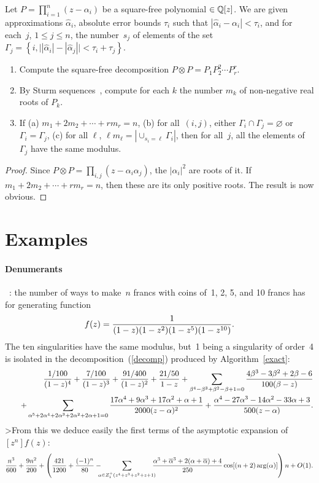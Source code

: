 \begin{alg}\label{test}
Let $P=\prod_{i=1}^n (z-\alpha_i)$ be a
square-free polynomial $\in {\Bbb Q}[z]$.
We are given
approximations $\hat\alpha_i$,
absolute error bounds $\tau_i$ such that  
$|\hat\alpha_i-\alpha_i|<\tau_i$,
and for each~$j$, $1 \leq j \leq n$, the number~$s_j$ of elements of the set
$ \Gamma_j=\left\{ i,
\bigl||\hat\alpha_i|-|\hat\alpha_j|\bigr|<\tau_i+\tau_j\right\}$.
\begin{enumerate}
\item Compute the square-free decomposition
$P\otimes P=P_1P_2^2\cdots P_r^r$.
\item By Sturm sequences~\cite{Sturm35}, compute for each $k$ the
number $m_k$ of non-negative real roots of $P_k$.
\item If (a) $m_1+2m_2+\cdots+rm_r=n$, (b) for all~$(i,j)$, either
$\Gamma_i \cap \Gamma_j=\varnothing$ 
or $\Gamma_i = \Gamma_j$, (c) for all $\ell$, $\ell m_\ell=
\left|\cup_{s_i=\ell} \Gamma_i \right|$,
then for all~$j$, all the elements of\/ $\Gamma_j$ have the same modulus.
\end{enumerate}
\end{alg}
\begin{proof} Since $P\otimes P=\prod_{i,j} (z-\alpha_i
\alpha_j)$, the $|\alpha_i|^2$ are roots of it. If
$m_1+2m_2+\cdots+rm_r=n$, then these are its only positive roots. The
result is now obvious.
\end{proof}

\section{Examples}

\paragraph{Denumerants}~\cite[p.~108]{Comtet74}: the  number of ways to make~$n$
francs  with coins of~1, 2,   5,   and 10 francs  has  for  generating
function      \[f(z)={1\over(1-z)(1-z^2)(1-z^5)(1-z^{10})}.\]     The
ten singularities have  the same  modulus,  but~1 being a
singularity of order~4 is isolated in the decomposition~(\ref{decomp})
produced by Algorithm~\ref{exact}:
\begin{eqnarray*}
&&{1/100\over(1-z)^4}+{7/100\over(1-z)^3}+{91/400\over(1-z)^2}+
{21/50\over1-z}+\sum_{\beta^4-\beta^3+\beta^2-\beta+1=0}{
4\beta^3-3\beta^2+2\beta-6\over100(\beta-z)}\\
&&\quad+\sum_{\alpha^5+2\alpha^4+2\alpha^3+2\alpha^2+2\alpha+1=0}{
{17\alpha^4+9\alpha^3+17\alpha^2+\alpha+1\over2000(z-\alpha)^2}+
{\alpha^4-27\alpha^3-14\alpha^2-33\alpha+3\over500(z-\alpha)}}.
\end{eqnarray*}
>From this we deduce easily the first terms of the asymptotic expansion
of~$[z^n]f(z)$:
$${n^3 \over 600}+{9n^2\over200}+
\left({421\over1200}+{(-1)^n\over80}-
\!\!\!\!\sum_{\alpha\in Z_1^+(z^4+z^3+z^2+z+1)}\!\!\!\!{\alpha^3+
\overline\alpha^3+2(\alpha+\overline\alpha)+4\over250}
\cos[(n+2)\arg(\alpha)]\right)n+O(1).$$

